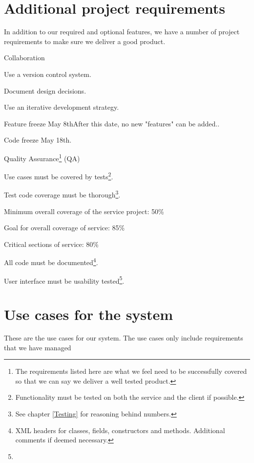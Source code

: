 \section{Additional project requirements}
\label{Requirements_Additional}
In addition to our required and optional features, we have a number of project requirements to make sure we deliver a good product. 
\begin{my_itemize}
	\item Collaboration 
	\begin{my_itemize}
		\item Use a version control system.
		\item Document design decisions.
		\item Use an iterative development strategy.
 		\item Feature freeze May 8th{After this date, no new "features" can be added.}.
		\item Code freeze May 18th.
	\end{my_itemize}
	\item Quality Assurance\footnote{The requirements listed here are what we feel need to be successfully covered so that we can say we deliver a well tested product.} (QA)
	\begin{my_itemize}
		\item Use cases must be covered by tests\footnote{Functionality must be tested on both the service and the client if possible.}.
		\item Test code coverage must be thorough\footnote{See chapter \ref{Testing}  for reasoning behind	numbers.}.
		\begin{my_itemize}
			\item Minimum overall coverage of the service project: 50\%
			\item Goal for overall coverage of service: 85\%
			\item Critical sections of service: 80\%
		\end{my_itemize}
		\item All code must be documented\footnote{XML headers for classes, fields, constructors and methods. Additional comments if deemed necessary.}.
		\item User interface must be usability tested\footnote{}.
	\end{my_itemize}
\end{my_itemize}

\section{Use cases for the system}
\label{Requirements_UC}
These are the use cases for our system. The use cases only include requirements that we have managed
